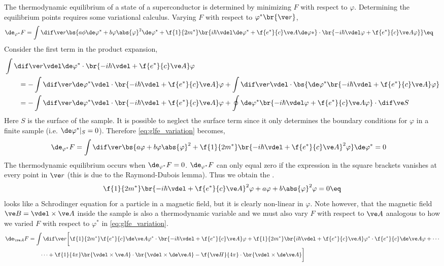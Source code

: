 \documentclass{article}
\newcommand{\vp}{\varphi}
\begin{document}
The thermodynamic equilibrium of a state of a superconductor is determined by minimizing $F$ with respect to $\vp$. Determining the equilibrium points requires some variational calculus. Varying $F$ with respect to $\vp^*\br{\ve r}$,
\begin{align*}
    \de_{\vp^*} F
    &= \int \dif \ve r \bs{a \phi \de \vp^* + b \vp \abs{\vp}^2 \de\vp^* + \f{1}{2m^{*}} \br{i\hbar \vdel \de \vp^* + \f{e^*}{c}\ve A \de \vp*}\cdot\br{-i\hbar \vdel \vp + \f{e^*}{c}\ve A \vp}} \eq \label{eq:glfe_variation}
\end{align*}
Consider the first term in the product expansion,
\begin{align*}
    &\int \dif \ve r \vdel \de \vp^* \cdot \br{-i\hbar \vdel + \f{e^*}{c}\ve A}\vp\\
    &\qquad = - \int \dif \ve r \de \vp^* \vdel \cdot \br{-i\hbar \vdel + \f{e^*}{c}\ve A}\vp + \int \dif \ve r \vdel \cdot \bs{\de \vp^* \br{-i\hbar \vdel + \f{e^*}{c}\ve A} \vp} \\
    &\qquad = - \int \dif \ve r \de \vp^* \vdel \cdot \br{-i\hbar \vdel + \f{e^*}{c}\ve A}\vp + \oint \de \vp^* \br{-i\hbar \vdel\vp + \f{e^*}{c}\ve A\vp}\cdot \dif \ve S
\end{align*}
Here $S$ is the surface of the sample. It is possible to neglect the surface term since it only determines the boundary conditions for $\vp$ in a finite sample (i.e. $\de \varphi^*|_S = 0$). Therefore \cref{eq:glfe_variation} becomes,
\begin{align*}
    \de_{\vp^*} F
    &= \int \dif \ve r \bs{a \vp + b \vp \abs{\vp}^2 + \f{1}{2m^*}\br{-i\hbar \vdel + \f{e^*}{c}\ve A}^2 \vp} \de \vp^* = 0
\end{align*}
The thermodynamic equilibrium occurs when $\de_{\vp^*} F = 0$. $\de_{\vp^*} F$ can only equal zero if the expression in the square brackets vanishes at every point in $\ve r$ (this is due to the Raymond-Dubois lemma). Thus we obtain the .
\[ \f{1}{2m^{*}}\br{-i\hbar \vdel + \f{e^*}{c} \ve A}^2 \vp + a \vp + b \abs{\vp}^2\vp = 0 \eq \label{eq:first_ginzburg-landau}\]
 looks like a Schrodinger equation for a particle in a magnetic field, but it is clearly non-linear in $\vp$. Note however, that the magnetic field $\ve B = \vdel \times \ve A$ inside the sample is also a thermodynamic variable and we must also vary $F$ with respect to $\ve A$ analogous to how we varied $F$ with respect to $\vp^*$ in \cref{eq:glfe_variation}.
\begin{align*}
    \de_{\ve A} F
    &= \int \dif \ve r \bigg[\f{1}{2m^*} \f{e^*}{c} \de \ve A \vp^* \cdot \br{-i\hbar \vdel + \f{e^*}{c}\ve A}\vp + \f{1}{2m^*}\br{i\hbar\vdel + \f{e^*}{c}\ve A}\vp^* \cdot \f{e^*}{c}\de \ve A \vp + \cdots \\
    &\qquad \cdots +\f{1}{4\pi}\br{\vdel \times \ve A}\cdot \br{\vdel \times \de \ve A} - \f{\ve H}{4\pi}\cdot \br{\vdel \times \de \ve A} \bigg]
\end{align*}
\end{document}
